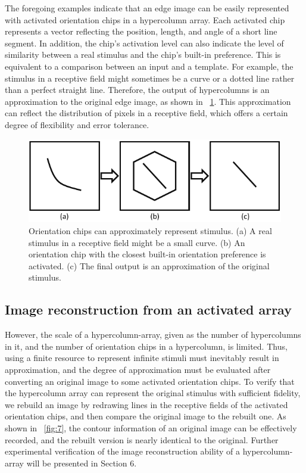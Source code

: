 \documentclass[journal]{IEEEtran}
\begin{document}
The foregoing examples indicate that an edge image can be easily represented with activated orientation chips in a hypercolumn array. 
Each activated chip represents a vector reflecting the position, length, and angle of a short line segment. 
In addition, the chip's activation level can also indicate the level of similarity between a real stimulus and the chip's built-in preference. 
This is equivalent to a comparison between an input and a template. 
For example, the stimulus in a receptive field might sometimes be a curve or a dotted line rather than a perfect straight line. 
Therefore, the output of hypercolumns is an approximation to the original edge image, 
as shown in \figurename~\ref{fig:6}. 
This approximation can reflect the distribution of pixels in a receptive field, which offers a certain degree of flexibility and error tolerance.

\begin{figure}[!t]
\centering
\includegraphics[width=0.6\linewidth]{images/fig6.pdf}
\caption{Orientation chips can approximately represent stimulus. 
(a) A real stimulus in a receptive field might be a small curve. 
(b) An orientation chip with the closest built-in orientation preference is activated. 
(c) The final output is an approximation of the original stimulus.}
\label{fig:6}
\end{figure}

\subsection{Image reconstruction from an activated array}

However, the scale of a hypercolumn-array, given as the number of hypercolumns in it, 
and the number of orientation chips in a hypercolumn, is limited. 
Thus, using a finite resource to represent infinite stimuli must inevitably result in approximation, 
and the degree of approximation must be evaluated after converting an original image to some activated orientation chips. 
To verify that the hypercolumn array can represent the original stimulus with sufficient fidelity, 
we rebuild an image by redrawing lines in the receptive fields of the activated orientation chips, 
and then compare the original image to the rebuilt one. 
As shown in \figurename~\ref{fig:7}, 
the contour information of an original image can be effectively recorded, 
and the rebuilt version is nearly identical to the original. 
Further experimental verification of the image reconstruction ability of a hypercolumn-array will be presented in Section 6.
\end{document}
